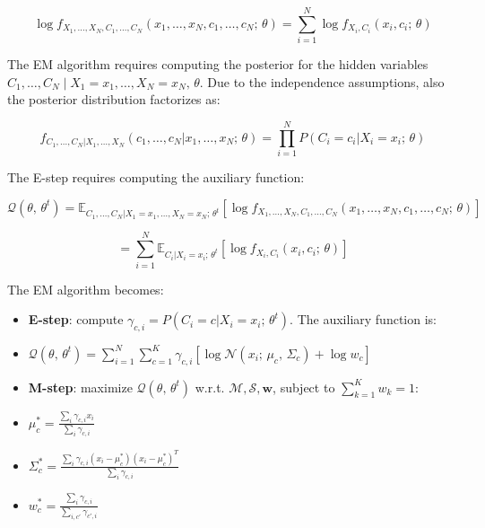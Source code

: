 \begin{equation*}
\log f_{X_1, \ldots, X_N, C_1, \ldots, C_N}(x_1, \ldots, x_N, c_1, \ldots, c_N;\,\theta) = \sum_{i=1}^N \log f_{X_i, C_i}(x_i, c_i;\,\theta)
\end{equation*}

The EM algorithm requires computing the posterior for the hidden variables $C_1,\ldots,C_N \mid X_1=x_1,\ldots,X_N=x_N,\,\theta$. Due to the independence assumptions, also the posterior distribution factorizes as:


\begin{equation*}
f_{C_1, \ldots, C_N | X_1, \ldots, X_N}(c_1, \ldots, c_N | x_1, \ldots, x_N;\,\theta) = \prod_{i=1}^N P(C_i = c_i | X_i = x_i;\,\theta)
\end{equation*}

The E-step requires computing the auxiliary function:


\begin{equation*}
\mathcal{Q}(\theta,\,\theta^t) = \mathbb{E}_{C_1, \ldots, C_N | X_1 = x_1, \ldots, X_N = x_N;\,\theta^t}[\log f_{X_1, \ldots, X_N, C_1, \ldots, C_N}(x_1, \ldots, x_N, c_1, \ldots, c_N;\,\theta)]
\end{equation*}


\begin{equation*}
= \sum_{i=1}^N \mathbb{E}_{C_i | X_i = x_i;\,\theta^t}[\log f_{X_i, C_i}(x_i, c_i;\,\theta)]
\end{equation*}

The EM algorithm becomes:
\begin{itemize}
	\item \textbf{E-step}: compute $\gamma_{c,i} = P(C_i = c | X_i = x_i;\,\theta^t)$. The auxiliary function is:
	\item[] $\mathcal{Q}(\theta,\,\theta^t) = \sum_{i=1}^N \sum_{c=1}^K \gamma_{c,i} [\log \mathcal{N}(x_i;\, \mu_c,\, \Sigma_c) + \log w_c]$
	\item \textbf{M-step}: maximize $\mathcal{Q}(\theta,\,\theta^t)$ w.r.t. $\mathcal{M}, \mathcal{S}, \mathbf{w}$, subject to $\sum_{k=1}^K w_k = 1$:
	\item[] $\mu_c^* = \frac{\sum_i \gamma_{c,i} x_i}{\sum_i \gamma_{c,i}}$
	\item[] $\Sigma_c^* = \frac{\sum_i \gamma_{c,i} (x_i - \mu_c^*)(x_i - \mu_c^*)^T}{\sum_i \gamma_{c,i}}$
	\item[] $w_c^* = \frac{\sum_i \gamma_{c,i}}{\sum_{i,c'} \gamma_{c',i}}$
\end{itemize}

